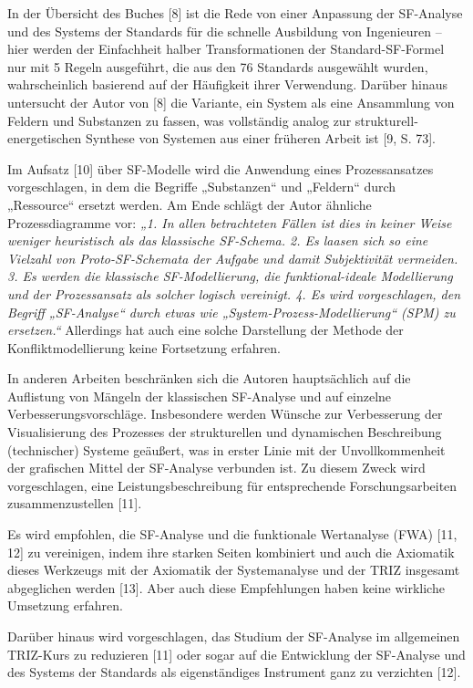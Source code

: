 \documentclass[11pt,a4paper]{article}
\begin{document}
In der Übersicht des Buches [8] ist die Rede von einer Anpassung der
SF-Analyse und des Systems der Standards für die schnelle Ausbildung von
Ingenieuren -- hier werden der Einfachheit halber Transformationen der
Standard-SF-Formel nur mit 5 Regeln ausgeführt, die aus den 76 Standards
ausgewählt wurden, wahrscheinlich basierend auf der Häufigkeit ihrer
Verwendung. Darüber hinaus untersucht der Autor von [8] die Variante, ein
System als eine Ansammlung von Feldern und Substanzen zu fassen, was
vollständig analog zur strukturell-energetischen Synthese von Systemen aus
einer früheren Arbeit ist [9, S. 73].

Im Aufsatz [10] über SF-Modelle wird die Anwendung eines Prozessansatzes
vorgeschlagen, in dem die Begriffe „Substanzen“ und „Feldern“ durch
„Ressource“ ersetzt werden. Am Ende schlägt der Autor ähnliche
Prozessdiagramme vor: \emph{„1. In allen betrachteten Fällen ist dies in
  keiner Weise weniger heuristisch als das klassische SF-Schema. 2.  Es laasen
  sich so eine Vielzahl von Proto-SF-Schemata der Aufgabe und damit
  Subjektivität vermeiden. 3.  Es werden die klassische SF-Modellierung, die
  funktional-ideale Modellierung und der Prozessansatz als solcher logisch
  vereinigt. 4. Es wird vorgeschlagen, den Begriff „SF-Analyse“ durch etwas
  wie „System-Prozess-Modellierung“ (SPM) zu ersetzen.“} Allerdings hat auch
eine solche Darstellung der Methode der Konfliktmodellierung keine Fortsetzung
erfahren.

In anderen Arbeiten beschränken sich die Autoren hauptsächlich auf die
Auflistung von Mängeln der klassischen SF-Analyse und auf einzelne
Verbesserungsvorschläge. Insbesondere werden Wünsche zur Verbesserung der
Visualisierung des Prozesses der strukturellen und dynamischen Beschreibung
(technischer) Systeme geäußert, was in erster Linie mit der Unvollkommenheit
der grafischen Mittel der SF-Analyse verbunden ist. Zu diesem Zweck wird
vorgeschlagen, eine Leistungsbeschreibung für entsprechende Forschungsarbeiten
zusammenzustellen [11].

Es wird empfohlen, die SF-Analyse und die funktionale Wertanalyse (FWA) [11,
  12] zu vereinigen, indem ihre starken Seiten kombiniert und auch die
Axiomatik dieses Werkzeugs mit der Axiomatik der Systemanalyse und der TRIZ
insgesamt abgeglichen werden [13]. Aber auch diese Empfehlungen haben keine
wirkliche Umsetzung erfahren.

Darüber hinaus wird vorgeschlagen, das Studium der SF-Analyse im allgemeinen
TRIZ-Kurs zu reduzieren [11] oder sogar auf die Entwicklung der SF-Analyse und
des Systems der Standards als eigenständiges Instrument ganz zu verzichten
[12].
\end{document}
